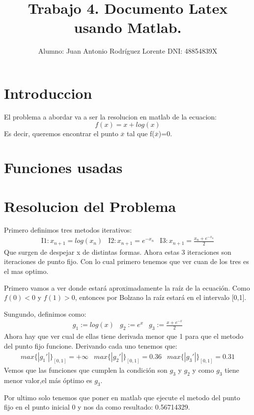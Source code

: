 \documentclass[a4paper]{article}
\title{Trabajo 4. Documento Latex usando Matlab.}
\author{Alumno: Juan Antonio Rodríguez Lorente DNI: 48854839X}
\date{}
\begin{document}
\maketitle


\section{Introduccion}
El problema a abordar va a ser la resolucion en matlab de la ecuacion:
\begin{equation}
f(x)=x+log(x)
\end{equation}
Es decir, queremos encontrar el punto $\overline{x}$ tal que f($\overline{x}$)=0.

\section{Funciones usadas}

\section{Resolucion del Problema}
Primero definimos tres metodos iterativos:
\begin{equation}
\begin{array}{ccc}
\mathrm{I1:}x_{n+1}=log(x_{n}) & \mathrm{I2:}x_{n+1}=e^{-x_{n}} & \mathrm{I3:}x_{n+1}=\frac{x_{n}+e^{-x_{n}}}{2}
\end{array}
\end{equation}
Que surgen de despejar x de distintas formas. Ahora estas 3 iteraciones son iteraciones de punto fijo. Con lo cual primero tenemos que ver cuan de los tres es el mas optimo.

Primero vamos a ver donde estará aproximadamente la raíz de la ecuación. Como $f(0)<0$ y $f(1)>0$, entonces por Bolzano la raíz estará en el intervalo [0,1].

Sungundo, definimos como:
\begin{equation}
\begin{array}{ccc}
g_{1}:=log(x) & g_{2}:=e^{x} & g_{3}:=\frac{x+e^{-x}}{2}
\end{array}
\end{equation}
Ahora hay que ver cual de ellas tiene derivada menor que 1 para que el metodo del punto fijo funcione. Derivando cada uno tenemos que:
\begin{equation}
\begin{array}{ccc}
max\{|g_{1}'|\}_{[0,1]}=+\infty & max\{|g_{2}'|\}_{[0,1]}=0.36 & max\{|g_{3}'|\}_{[0,1]}=0.31
\end{array}
\end{equation}
Vemos que las funciones que cumplen la condición son $g_{3}$ y $g_{2}$ y como $g_{3}$ tiene menor valor,el más óptimo es $g_{3}$.

Por ultimo solo tenemos que poner en matlab que ejecute el metodo del punto fijo en el punto inicial 0 y nos da como resultado: 0.56714329.
\end{document}
